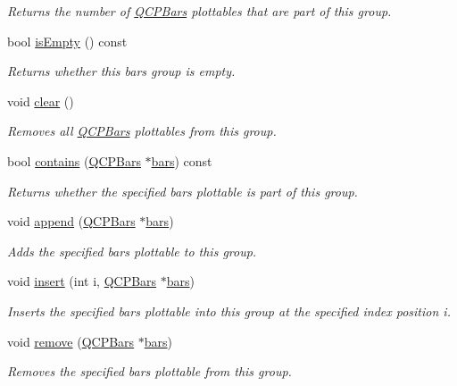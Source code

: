 \begin{DoxyCompactItemize}
\begin{DoxyCompactList}\small\item\em Returns the number of \hyperlink{classQCPBars}{Q\+C\+P\+Bars} plottables that are part of this group. \end{DoxyCompactList}\item 
bool \hyperlink{classQCPBarsGroup_a1d89da4e9176f4f77105e9a4afd44e2b}{is\+Empty} () const 
\begin{DoxyCompactList}\small\item\em Returns whether this bars group is empty. \end{DoxyCompactList}\item 
void \hyperlink{classQCPBarsGroup_a3ddf23928c6cd89530bd34ab7ba7b177}{clear} ()
\begin{DoxyCompactList}\small\item\em Removes all \hyperlink{classQCPBars}{Q\+C\+P\+Bars} plottables from this group. \end{DoxyCompactList}\item 
\hypertarget{classQCPBarsGroup_adb4837894167e629e42e200db056fac3}{}bool \hyperlink{classQCPBarsGroup_adb4837894167e629e42e200db056fac3}{contains} (\hyperlink{classQCPBars}{Q\+C\+P\+Bars} $\ast$\hyperlink{classQCPBarsGroup_a7c72ed1f8cd962c93b8c42ab96cd91ec}{bars}) const \label{classQCPBarsGroup_adb4837894167e629e42e200db056fac3}

\begin{DoxyCompactList}\small\item\em Returns whether the specified {\itshape bars} plottable is part of this group. \end{DoxyCompactList}\item 
void \hyperlink{classQCPBarsGroup_a809ed63cc4ff7cd5b0b8c96b470163d3}{append} (\hyperlink{classQCPBars}{Q\+C\+P\+Bars} $\ast$\hyperlink{classQCPBarsGroup_a7c72ed1f8cd962c93b8c42ab96cd91ec}{bars})
\begin{DoxyCompactList}\small\item\em Adds the specified {\itshape bars} plottable to this group. \end{DoxyCompactList}\item 
void \hyperlink{classQCPBarsGroup_a309a5f7233db189f3ea9c2d04ece6c13}{insert} (int i, \hyperlink{classQCPBars}{Q\+C\+P\+Bars} $\ast$\hyperlink{classQCPBarsGroup_a7c72ed1f8cd962c93b8c42ab96cd91ec}{bars})
\begin{DoxyCompactList}\small\item\em Inserts the specified {\itshape bars} plottable into this group at the specified index position {\itshape i}. \end{DoxyCompactList}\item 
void \hyperlink{classQCPBarsGroup_a215e28a5944f1159013a0e19169220e7}{remove} (\hyperlink{classQCPBars}{Q\+C\+P\+Bars} $\ast$\hyperlink{classQCPBarsGroup_a7c72ed1f8cd962c93b8c42ab96cd91ec}{bars})
\begin{DoxyCompactList}\small\item\em Removes the specified {\itshape bars} plottable from this group. \end{DoxyCompactList}\end{DoxyCompactItemize}
